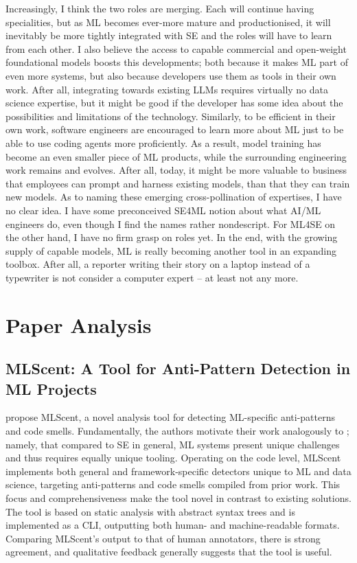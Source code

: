 \documentclass[11pt]{article}
\begin{document}
Increasingly, I think the two roles are merging. Each will continue having specialities, but as ML becomes ever-more mature and productionised, it will inevitably be more tightly integrated with SE and the roles will have to learn from each other. I also believe the access to capable commercial and open-weight foundational models boosts this developments; both because it makes ML part of even more systems, but also because developers use them as tools in their own work. After all, integrating towards existing LLMs requires virtually no data science expertise, but it might be good if the developer has some idea about the possibilities and limitations of the technology. Similarly, to be efficient in their own work, software engineers are encouraged to learn more about ML just to be able to use coding agents more proficiently. As a result, model training has become an even smaller piece of ML products, while the surrounding engineering work remains and evolves. After all, today, it might be more valuable to business that employees can prompt and harness existing models, than that they can train new models. As to naming these emerging cross-pollination of expertises, I have no clear idea. I have some preconceived SE4ML notion about what AI/ML engineers do, even though I find the names rather nondescript. For ML4SE on the other hand, I have no firm grasp on roles yet. In the end, with the growing supply of capable models, ML is really becoming another tool in an expanding toolbox. After all, a reporter writing their story on a laptop instead of a typewriter is not consider a computer expert – at least not any more.

\section{Paper Analysis}
\subsection{MLScent: A Tool for Anti-Pattern Detection in ML Projects}
\label{sec:mlscent}
\citet{shivashankarMLScentToolAntiPattern2025} propose MLScent, a novel analysis tool for detecting ML-specific anti-patterns and code smells. Fundamentally, the authors motivate their work analogously to \citet{sculleyHiddenTechnicalDebt2015}; namely, that compared to SE in general, ML systems present unique challenges and thus requires equally unique tooling. Operating on the code level, MLScent implements both general and framework-specific detectors unique to ML and data science, targeting anti-patterns and code smells compiled from prior work. This focus and comprehensiveness make the tool novel in contrast to existing solutions. The tool is based on static analysis with abstract syntax trees and is implemented as a CLI, outputting both human- and machine-readable formats. Comparing MLScent's output to that of human annotators, there is strong agreement, and qualitative feedback generally suggests that the tool is useful.
\end{document}
